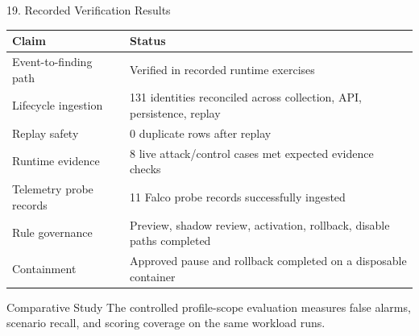 \documentclass[aspectratio=169,10pt]{beamer}
\begin{document}
\begin{frame}{19. Recorded Verification Results}
\small
\begin{table}\centering
\begin{tabularx}{\textwidth}{X l}\toprule
\textbf{Claim} & \textbf{Status} \\\midrule
Event-to-finding path & Verified in recorded runtime exercises \\
Lifecycle ingestion & 131 identities reconciled across collection, API, persistence, replay \\
Replay safety & 0 duplicate rows after replay \\
Runtime evidence & 8 live attack/control cases met expected evidence checks \\
Telemetry probe records & 11 Falco probe records successfully ingested \\
Rule governance & Preview, shadow review, activation, rollback, disable paths completed \\
Containment & Approved pause and rollback completed on a disposable container \\
\bottomrule
\end{tabularx}
\end{table}
\begin{block}{Comparative Study}
The controlled profile-scope evaluation measures false alarms, scenario recall, and scoring coverage on the same workload runs.
\end{block}
\end{frame}
\end{document}
